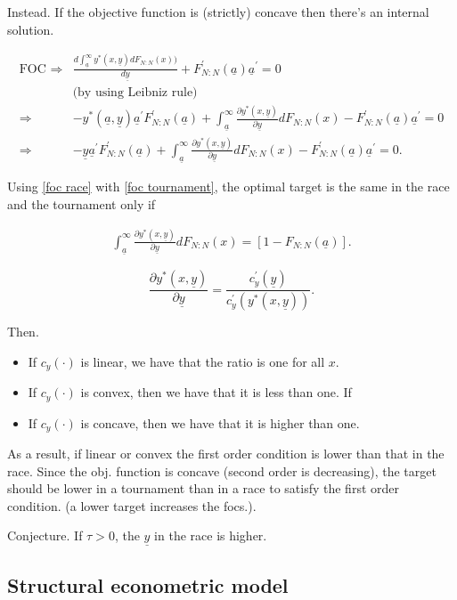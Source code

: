 \documentclass[12pt,]{article}
\theoremstyle{plain} %
\newcommand\target{\underline{y}}
\newcommand\mtype{\underline{a}}
\newcommand\dystar{\frac{\partial y^*(x,\target)}{\partial\target}dF_{N:N}(x)}
\begin{document}
Instead. If the objective function is (strictly) concave then there's an
internal solution.

\begin{align} \label{foc tournament}
  \text{FOC } \Rightarrow & 
    \frac{d\int_{\mtype}^\infty y^*(x, \target) d F_{N:N}(x)) }{d \target}
      + F^\prime_{N:N}(\mtype) \mtype^\prime =0 \nonumber\\ 
    & \text{(by using Leibniz rule)}\nonumber\\
  \Rightarrow & - y^*(\mtype, \target) \mtype^\prime F^\prime_{N:N}(\mtype) 
      + \int_{\mtype}^\infty \dystar - F^\prime_{N:N}(\mtype) \mtype^\prime = 0\nonumber\\
  \Rightarrow & -\target \mtype^\prime F^\prime_{N:N}(\mtype) 
      + \int_{\mtype}^\infty \dystar - F^\prime_{N:N}(\mtype) \mtype^\prime = 0.
\end{align}

Using \eqref{foc race} with \eqref{foc tournament}, the optimal target
is the same in the race and the tournament only if

\begin{align} 
  \int_{\mtype}^\infty \dystar = [1- F_{N:N}(\mtype)].
\end{align}

\[
  \frac{\partial y^*(x, \target)}{\partial \target} = 
    \frac{c_y^\prime(\target)}{c_y^\prime(y^*(x, \target))}. 
\]

Then.

\begin{itemize}
\item
  If \(c_y(\cdot)\) is linear, we have that the ratio is one for all
  \(x\).
\item
  If \(c_y(\cdot)\) is convex, then we have that it is less than one. If
\item
  If \(c_y(\cdot)\) is concave, then we have that it is higher than one.
\end{itemize}

As a result, if linear or convex the first order condition is lower than
that in the race. Since the obj. function is concave (second order is
decreasing), the target should be lower in a tournament than in a race
to satisfy the first order condition. (a lower target increases the
focs.).

Conjecture. If \(\tau>0\), the \(\target\) in the race is higher.

\subsection{Structural econometric
model}\label{structural-econometric-model}
\end{document}
